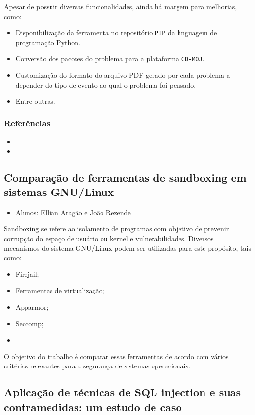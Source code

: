 \documentclass{article}
\newcommand*{\nsubsection}[1]{
    \subsection*{#1}
}
\newcommand{\pip}{\texttt{PIP}\xspace}
\newcommand{\cdmoj}{\texttt{CD-MOJ}\xspace}
\begin{document}
Apesar de possuir diversas funcionalidades, ainda há margem para melhorias, como:

\begin{itemize}
	\item Disponibilização da ferramenta no repositório \pip da linguagem de programação Python.
	\item Conversão dos pacotes do problema para a plataforma \cdmoj.
	\item Customização do formato do arquivo PDF gerado por cada problema a depender do tipo de evento ao qual o problema foi pensado.
	\item Entre outras.
\end{itemize}


\subsubsection*{Referências}

\begin{itemize}
	\item {}
	\item {}
\end{itemize}


\nsubsection{Comparação de ferramentas de sandboxing em sistemas GNU/Linux}

\begin{itemize}
	\item Alunos: Ellian Aragão e João Rezende
\end{itemize}
Sandboxing se refere ao isolamento de programas com objetivo de prevenir corrupção do espaço de usuário ou kernel e vulnerabilidades. Diversos mecanismos do sistema GNU/Linux podem ser utilizadas para este propósito, tais como: 
\begin{itemize}
	\item Firejail;
	\item Ferramentas de virtualização;
	\item Apparmor;
	\item Seccomp;
	\item \ldots
\end{itemize}



O objetivo do trabalho é comparar essas ferramentas de acordo com vários critérios relevantes para a segurança de sistemas operacionais.

\nsubsection{Aplicação de técnicas de SQL injection e suas contramedidas: um estudo de caso}
\end{document}
